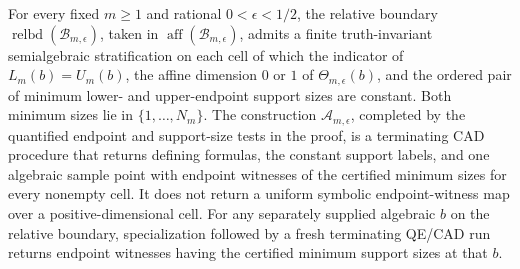 For every fixed \(m\geq1\) and rational \(0<\epsilon<1/2\), the relative boundary \(\operatorname{relbd}(\mathcal B_{m,\epsilon})\), taken in \(\operatorname{aff}(\mathcal B_{m,\epsilon})\), admits a finite truth-invariant semialgebraic stratification on each cell of which the indicator of \(L_m(b)=U_m(b)\), the affine dimension \(0\) or \(1\) of \(\Theta_{m,\epsilon}(b)\), and the ordered pair of minimum lower- and upper-endpoint support sizes are constant.  Both minimum sizes lie in \(\{1,\ldots,N_m\}\).  The construction \(\mathcal A_{m,\epsilon}\), completed by the quantified endpoint and support-size tests in the proof, is a terminating CAD procedure that returns defining formulas, the constant support labels, and one algebraic sample point with endpoint witnesses of the certified minimum sizes for every nonempty cell.  It does not return a uniform symbolic endpoint-witness map over a positive-dimensional cell.  For any separately supplied algebraic \(b\) on the relative boundary, specialization followed by a fresh terminating QE/CAD run returns endpoint witnesses having the certified minimum support sizes at that \(b\).
